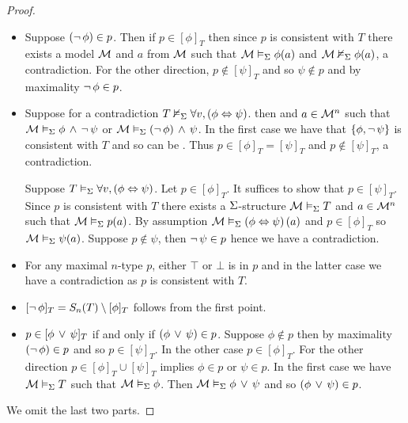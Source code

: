 \begin{proof}~
    \begin{itemize}
        \item Suppose $(\neg\, \phi) \in p$.
            Then if $p \in [\phi]_T$ then since $p$ is consistent with $T$
            there exists a model $\mathcal{M}$ and $a$ from 
            $\mathcal{M}$ such that
            $\mathcal{M} \vDash_{\Sigma} \phi(a)$ and $\mathcal{M} \nvDash_{\Sigma} \phi(a)$, 
            a contradiction.
            For the other direction, 
            $p \notin [\psi]_T$ and so $ \psi \notin p$ and
            by maximality $\neg\, \phi \in p$.
        \item \begin{forward}
            Suppose for a contradiction
            $T \nvDash_{\Sigma} \forall v, \left(\phi \Leftrightarrow \psi\right)$.
            then  and $a \in {\mathcal{M}}^n$ such that 
            $\mathcal{M} \vDash_{\Sigma} \phi \, \land \, \neg\, \psi$ or 
            $\mathcal{M} \vDash_{\Sigma} (\neg\, \phi) \, \land \, \psi$.
            In the first case we have that $\left\{\phi, \neg\, \psi\right\}$ 
            is consistent with $T$ and so can be 
            .
            Thus $p \in [\phi]_T = [\psi]_T$ and $p \notin [\psi]_T$, 
            a contradiction.
            \end{forward}
            \begin{backward}
                Suppose $T \vDash_{\Sigma} \forall v, \left(\phi \Leftrightarrow \psi\right)$.
                Let $p \in [\phi]_T$.
                It suffices to show that $p \in [\psi]_T$.
                Since $p$ is consistent with $T$ there exists a $\Sigma$-structure
                $\mathcal{M} \vDash_{\Sigma} T$ and $a \in {\mathcal{M}}^n$ such that 
                $\mathcal{M} \vDash_{\Sigma} p(a)$.
                By assumption $\mathcal{M} \vDash_{\Sigma} \left(\phi \Leftrightarrow \psi\right)(a)$
                and $p \in [\phi]_T$ so 
                $\mathcal{M} \vDash_{\Sigma} \psi(a)$.
                Suppose $p \notin \psi$, then $\neg\, \psi \in p$ hence 
                we have a contradiction.
            \end{backward}
        \item For any maximal $n$-type $p$,
            either $\top$ or $\bot$ is in $p$ and in the latter case we have a 
            contradiction as $p$ is consistent with $T$.
        \item $[\neg\, \phi]_T = S_n(T) \setminus [\phi]_T$ follows from the 
            first point.
        \item $p \in [\phi \, \lor \, \psi]_T$ if and only if 
            $(\phi \, \lor \, \psi) \in p$. 
            Suppose $\phi \notin p$ then by maximality 
            $(\neg\, \phi) \in p$ and so $p \in [\psi]_T$. 
            In the other case $p \in [\phi]_T$.
            For the other direction $p \in [\phi]_T \cup [\psi]_T$
            implies $\phi \in p$ or $\psi \in p$.
            In the first case we have $\mathcal{M} \vDash_{\Sigma} T$ such that 
            $\mathcal{M} \vDash_{\Sigma} \phi$.
            Then $\mathcal{M} \vDash_{\Sigma} \phi \, \lor \, \psi$ and so $(\phi \, \lor \, \psi) \in p$.
    \end{itemize}
    We omit the last two parts.
\end{proof}


